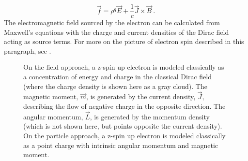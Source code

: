 \documentclass[onecolumn,secnumarabic,amsmath,amssymb,balancelastpage,nofootinbib,12pt]{article}
\begin{document}
\begin{equation}
\vec{f}=\rho^q\vec{E}+\frac{1}{c}\vec{J}\times\vec{B}
\ .
\label{forcelaw}
\end{equation}
The electromagnetic field sourced by the electron can be calculated from Maxwell's equations with the charge and current densities of the Dirac field acting as source terms.  For more on the picture of electron spin described in this paragraph, see \citet{ohanian, chuu2010, howelectronsspin, smallelectronstates, spinmeasurement}.

\begin{figure}[htb]
\caption{On the field approach, a z-spin up electron is modeled classically as a concentration of energy and charge in the classical Dirac field (where the charge density is shown here as a gray cloud).  The magnetic moment, $\vec{m}$, is generated by the current density, $\vec{J}$, describing the flow of negative charge in the opposite direction.  The angular momentum, $\vec{L}$, is generated by the momentum density (which is not shown here, but points opposite the current density).  On the particle approach, a z-spin up electron is modeled classically as a point charge with intrinsic angular momentum and magnetic moment.}
  \label{spinfigure}
\end{figure}
\end{document}
